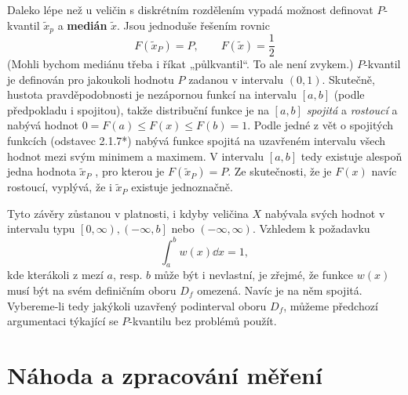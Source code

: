       Daleko lépe než u veličin s diskrétním rozdělením vypadá možnost definovat \(P\)-kvantil 
      \(\tilde{x}_p\) a \textbf{medián} \(\tilde{x}\). Jsou jednoduše řešením rovnic
      \begin{equation*}
        F(\tilde{x}_P) = P, \qquad F(\tilde{x}) = \dfrac{1}{2}
      \end{equation*}
      (Mohli bychom mediánu třeba i říkat „půlkvantil“. To ale není zvykem.) \(P\)-kvantil je 
      definován pro jakoukoli hodnotu \(P\) zadanou v intervalu \((0, 1)\). Skutečně, hustota 
      pravděpodobnosti je nezápornou funkcí na intervalu \([a, b]\) (podle předpokladu i spojitou), 
      takže distribuční funkce je na \([a, b]\) \emph{spojitá} a \emph{rostoucí} a nabývá hodnot 
      \(0 = F(a) \leq F(x) \leq F(b) = 1\). Podle jedné z vět o spojitých funkcích (odstavec 
      2.1.7*) nabývá funkce spojitá na uzavřeném intervalu všech hodnot mezi svým minimem a 
      maximem. V intervalu \([a, b]\) tedy existuje alespoň jedna hodnota \(\tilde{x}_P\) , pro 
      kterou je \(F(\tilde{x}_P) = P\). Ze skutečnosti, že je \(F(x)\) navíc rostoucí, vyplývá, že 
      i \(\tilde{x}_P\) existuje jednoznačně.
  
      Tyto závěry zůstanou v platnosti, i kdyby veličina \(X\) nabývala svých hodnot v intervalu
      typu \(\left[0, \infty\right), \left(-\infty, b\right]\) nebo \((-\infty, \infty)\). Vzhledem 
      k požadavku
      \begin{equation*}
        \int_{a}^{b}w(x)\dd{x} = 1,
      \end{equation*}
      kde kterákoli z mezí \(a\), resp. \(b\) může být i nevlastní, je zřejmé, že funkce \(w(x)\) 
      musí být na svém definičním oboru \(D_f\) omezená. Navíc je na něm spojitá. Vybereme-li tedy 
      jakýkoli uzavřený podinterval oboru \(D_f\), můžeme předchozí argumentaci týkající se 
      \(P\)-kvantilu bez problémů použít.

      
  
      
  
  \section{Náhoda a zpracování měření}\label{mai:IchapIVsecIV}
